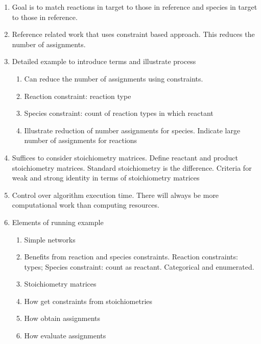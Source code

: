\documentclass{article}
\begin{document}
\begin{enumerate}
    \item Goal is to match reactions in target to those in reference and species in target to those in reference.
    
    \item Reference related work that uses constraint based approach. This reduces the number of assignments.

    \item Detailed example to introduce terms and illustrate process
    \begin{enumerate}
        \item Can reduce the number of assignments using constraints.
        \item Reaction constraint: reaction type
        \item Species constraint: count of reaction types in which reactant
        \item Illustrate reduction of number assignments for species. Indicate large number of assignments for reactions
    \end{enumerate}
    
    \item Suffices to consider stoichiometry matrices. Define reactant and product stoichiometry matrices. Standard stoichiometry is the difference. Criteria for weak and strong identity in terms of stoichiometry matrices
    
    \item Control over algorithm execution time. There will always be more computational work than computing resources.

    \item Elements of running example
    \begin{enumerate}
        \item Simple networks
        \item Benefits from reaction and species constraints. Reaction constraints: types; Species constraint: count as reactant. Categorical and enumerated.
        \item Stoichiometry matrices
        \item How get constraints from stoichiometries
        \item How obtain assignments
        \item How evaluate assignments
        
    \end{enumerate}
\end{enumerate}
\end{document}
